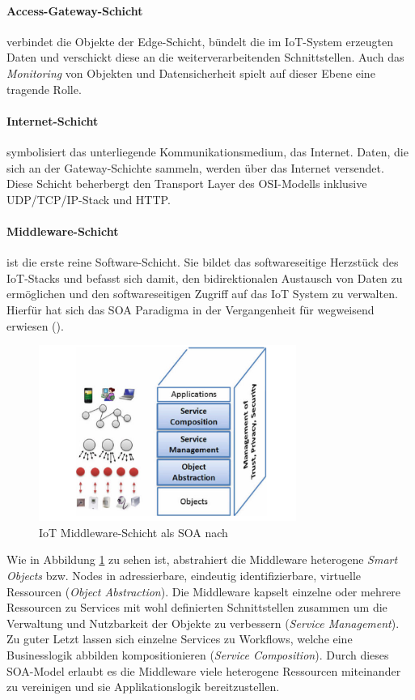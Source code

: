 \paragraph{Access-Gateway-Schicht} verbindet die Objekte der Edge-Schicht, bündelt die im \ac{IoT}-System erzeugten Daten und verschickt diese an die weiterverarbeitenden Schnittstellen. Auch das \textit{Monitoring} von Objekten und Datensicherheit spielt auf dieser Ebene eine tragende Rolle. 

\paragraph{Internet-Schicht} symbolisiert das unterliegende Kommunikationsmedium, das Internet. Daten, die sich an der  Gateway-Schichte sammeln, werden über das Internet versendet. Diese Schicht beherbergt den Transport Layer des OSI-Modells inklusive UDP/TCP/IP-Stack und HTTP.

\paragraph{Middleware-Schicht} ist die erste reine Software-Schicht. Sie bildet das softwareseitige Herzstück des \ac{IoT}-Stacks und befasst sich damit, den bidirektionalen Austausch von Daten zu ermöglichen und den softwareseitigen Zugriff auf das \ac{IoT} System zu verwalten. Hierfür hat sich das \ac{SOA} Paradigma in der Vergangenheit für wegweisend erwiesen (\cite{laliwala2008event}).
\begin{figure}[h]
    \centering
    \includegraphics[width=0.75\textwidth]{bilder/chapter2/iotsoa.png}
    \caption{IoT Middleware-Schicht als \ac{SOA} nach \cite{bandyopadhyay2011internet}}
    \label{fig:iotsoa}
\end{figure}
Wie in Abbildung \ref{fig:iotsoa} zu sehen ist, abstrahiert die Middleware heterogene \textit{Smart Objects} bzw. Nodes in adressierbare, eindeutig identifizierbare, virtuelle Ressourcen (\textit{Object Abstraction}). Die Middleware kapselt einzelne oder mehrere Ressourcen zu Services mit wohl definierten Schnittstellen zusammen um die Verwaltung und Nutzbarkeit der Objekte zu verbessern (\textit{Service Management}). Zu guter Letzt lassen sich einzelne Services zu Workflows, welche eine Businesslogik abbilden kompositionieren (\textit{Service Composition}). Durch dieses \ac{SOA}-Model erlaubt es die Middleware viele heterogene Ressourcen miteinander zu vereinigen und sie Applikationslogik bereitzustellen. 

